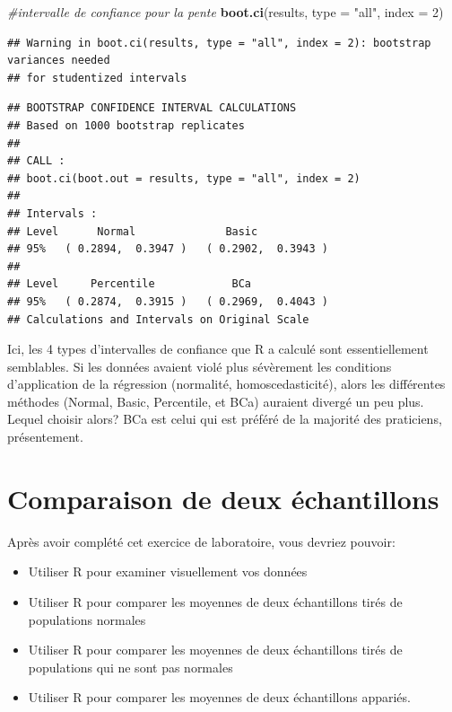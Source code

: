 \documentclass[12pt,]{book}
\newenvironment{Shaded}{\begin{snugshade}}{\end{snugshade}}
\newcommand{\CommentTok}[1]{\textcolor[rgb]{0.37,0.37,0.37}{\textit{#1}}}
\newcommand{\DataTypeTok}[1]{\textcolor[rgb]{0.27,0.27,0.27}{#1}}
\newcommand{\DecValTok}[1]{\textcolor[rgb]{0.06,0.06,0.06}{#1}}
\newcommand{\KeywordTok}[1]{\textcolor[rgb]{0.27,0.27,0.27}{\textbf{#1}}}
\newcommand{\NormalTok}[1]{#1}
\newcommand{\StringTok}[1]{\textcolor[rgb]{0.5,0.5,0.5}{#1}}
\providecommand{\tightlist}{%
  \setlength{\itemsep}{0pt}\setlength{\parskip}{0pt}}
\begin{document}
\begin{Shaded}
\begin{Highlighting}[]
\CommentTok{#intervalle de confiance pour la pente}
\KeywordTok{boot.ci}\NormalTok{(results, }\DataTypeTok{type =} \StringTok{"all"}\NormalTok{, }\DataTypeTok{index =} \DecValTok{2}\NormalTok{)}
\end{Highlighting}
\end{Shaded}

\begin{verbatim}
## Warning in boot.ci(results, type = "all", index = 2): bootstrap variances needed
## for studentized intervals
\end{verbatim}

\begin{verbatim}
## BOOTSTRAP CONFIDENCE INTERVAL CALCULATIONS
## Based on 1000 bootstrap replicates
## 
## CALL : 
## boot.ci(boot.out = results, type = "all", index = 2)
## 
## Intervals : 
## Level      Normal              Basic         
## 95%   ( 0.2894,  0.3947 )   ( 0.2902,  0.3943 )  
## 
## Level     Percentile            BCa          
## 95%   ( 0.2874,  0.3915 )   ( 0.2969,  0.4043 )  
## Calculations and Intervals on Original Scale
\end{verbatim}

Ici, les 4 types d'intervalles de confiance que R a calculé sont essentiellement semblables. Si les données avaient violé plus sévèrement les conditions d'application de la régression (normalité, homoscedasticité), alors les différentes méthodes (Normal, Basic, Percentile, et BCa) auraient divergé un peu plus. Lequel choisir alors? BCa est celui qui est préféré de la majorité des praticiens, présentement.

\hypertarget{comparaison-de-deux-uxe9chantillons}{%
\chapter{Comparaison de deux échantillons}\label{comparaison-de-deux-uxe9chantillons}}

Après avoir complété cet exercice de laboratoire, vous devriez pouvoir:

\begin{itemize}
\tightlist
\item
  Utiliser R pour examiner visuellement vos données
\item
  Utiliser R pour comparer les moyennes de deux échantillons tirés de populations normales
\item
  Utiliser R pour comparer les moyennes de deux échantillons tirés de populations qui ne sont pas normales
\item
  Utiliser R pour comparer les moyennes de deux échantillons appariés.
\end{itemize}
\end{document}
